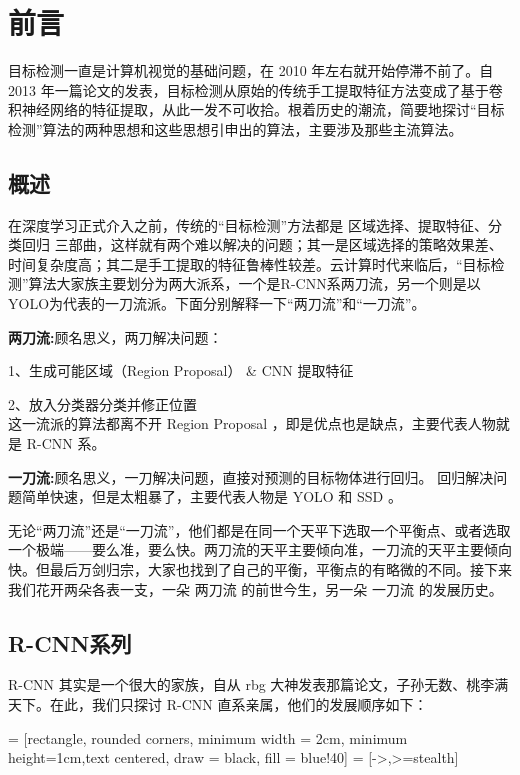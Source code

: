 \section{前言}
\setcounter{figure}{0}

目标检测一直是计算机视觉的基础问题，在 2010 年左右就开始停滞不前了。自 2013 年一篇论文的发表，目标检测从原始的传统手工提取特征方法变成了基于卷积神经网络的特征提取，从此一发不可收拾。根着历史的潮流，简要地探讨“目标检测”算法的两种思想和这些思想引申出的算法，主要涉及那些主流算法。
\subsection{概述}
在深度学习正式介入之前，传统的“目标检测”方法都是 区域选择、提取特征、分类回归 三部曲，这样就有两个难以解决的问题；其一是区域选择的策略效果差、时间复杂度高；其二是手工提取的特征鲁棒性较差。云计算时代来临后，“目标检测”算法大家族主要划分为两大派系，一个是R-CNN系两刀流，另一个则是以YOLO为代表的一刀流派。下面分别解释一下“两刀流”和“一刀流”。

\textbf{两刀流:}顾名思义，两刀解决问题：

1、生成可能区域（Region Proposal） \& CNN 提取特征 

2、放入分类器分类并修正位置 \\
这一流派的算法都离不开 Region Proposal ，即是优点也是缺点，主要代表人物就是 R-CNN 系。

\textbf{一刀流:}顾名思义，一刀解决问题，直接对预测的目标物体进行回归。
回归解决问题简单快速，但是太粗暴了，主要代表人物是 YOLO 和 SSD 。

无论“两刀流”还是“一刀流”，他们都是在同一个天平下选取一个平衡点、或者选取一个极端——要么准，要么快。两刀流的天平主要倾向准，一刀流的天平主要倾向快。但最后万剑归宗，大家也找到了自己的平衡，平衡点的有略微的不同。接下来我们花开两朵各表一支，一朵 两刀流 的前世今生，另一朵 一刀流 的发展历史。
\subsection{R-CNN系列}
R-CNN 其实是一个很大的家族，自从 rbg 大神发表那篇论文，子孙无数、桃李满天下。在此，我们只探讨 R-CNN 直系亲属，他们的发展顺序如下：

\vspace{10pt}
 = [rectangle, rounded corners, minimum width = 2cm, minimum height=1cm,text centered, draw = black, fill = blue!40]
 = [->,>=stealth]


